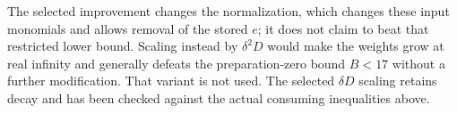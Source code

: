 The selected improvement changes the normalization, which changes these
input monomials and allows removal of the stored $e$; it does not claim
to beat that restricted lower bound. Scaling instead by $\delta^2D$
would make the weights grow at real infinity and generally defeats the
preparation-zero bound $B<17$ without a further modification. That
variant is not used. The selected $\delta D$ scaling retains decay and
has been checked against the actual consuming inequalities above.
